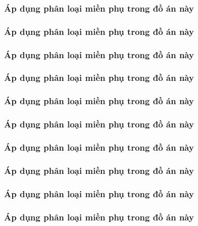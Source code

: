 \subsubsection{Áp dụng phân loại miền phụ trong đồ án này}

\subsubsection{Áp dụng phân loại miền phụ trong đồ án này}

\subsubsection{Áp dụng phân loại miền phụ trong đồ án này}

\subsubsection{Áp dụng phân loại miền phụ trong đồ án này}

\subsubsection{Áp dụng phân loại miền phụ trong đồ án này}

\subsubsection{Áp dụng phân loại miền phụ trong đồ án này}

\subsubsection{Áp dụng phân loại miền phụ trong đồ án này}

\subsubsection{Áp dụng phân loại miền phụ trong đồ án này}

\subsubsection{Áp dụng phân loại miền phụ trong đồ án này}

\subsubsection{Áp dụng phân loại miền phụ trong đồ án này}

